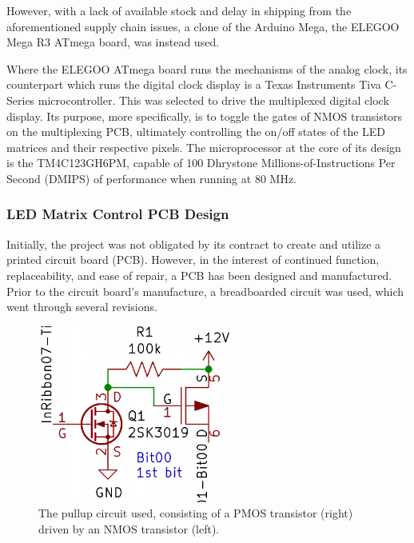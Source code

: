 \documentclass[11pt]{article}
\begin{document}
However, with a lack of available stock and delay in shipping from the aforementioned supply chain issues, a clone of the Arduino Mega, the ELEGOO Mega R3 ATmega board, was instead used. 

Where the ELEGOO ATmega board runs the mechanisms of the analog clock, its counterpart which runs the digital clock display is a Texas Instruments Tiva C-Series microcontroller. 
This was selected to drive the multiplexed digital clock display. 
Its purpose, more specifically, is to toggle the gates of NMOS transistors on the multiplexing PCB, ultimately controlling the on/off states of the LED matrices and their respective pixels. 
The microprocessor at the core of its design is the TM4C123GH6PM, capable of 100 Dhrystone Millions-of-Instructions Per Second (DMIPS) of performance when running at 80 MHz. 

\subsubsection{LED Matrix Control PCB Design}
\label{PCBDesign}



Initially, the project was not obligated by its contract to create and utilize a printed circuit board (PCB). 
However, in the interest of continued function, replaceability, and ease of repair, a PCB has been designed and manufactured. 
Prior to the circuit board's manufacture, a breadboarded circuit was used, which went through several revisions. 

\begin{figure}[H]
\centering
\includegraphics[width=2.5in]{basic_transistor_circuit.png}
\caption{The pullup circuit used, consisting of a PMOS transistor (right) driven by an NMOS transistor (left).}
\label{transistor_pullup}
\end{figure}
\end{document}
